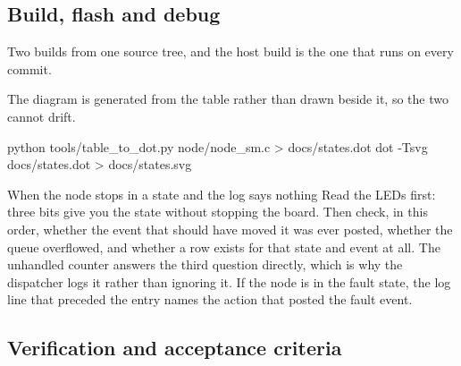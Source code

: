 \subsection*{Build, flash and debug}


Two builds from one source tree, and the host build is the one that runs on
every commit.


The diagram is generated from the table rather than drawn beside it, so the two
cannot drift.

\begin{shellcode}
python tools/table_to_dot.py node/node_sm.c > docs/states.dot
dot -Tsvg docs/states.dot > docs/states.svg
\end{shellcode}

\begin{note}{When the node stops in a state and the log says nothing}
Read the LEDs first: three bits give you the state without stopping the board.
Then check, in this order, whether the event that should have moved it was ever
posted, whether the queue overflowed, and whether a row exists for that state
and event at all. The unhandled counter answers the third question directly,
which is why the dispatcher logs it rather than ignoring it. If the node is in
the fault state, the log line that preceded the entry names the action that
posted the fault event.
\end{note}

\subsection*{Verification and acceptance criteria}

